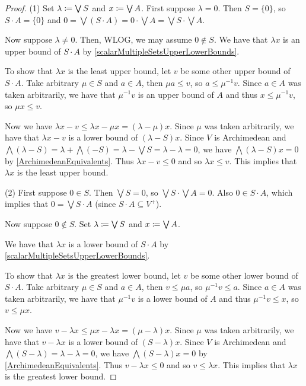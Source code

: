 \begin{proof}
(1) Set $\lambda \coloneqq \bigvee S$ and $x \coloneqq \bigvee A$. First suppose $\lambda = 0$. Then $S = \{0\}$, so $S\cdot A = \{0\}$ and $0 = \bigvee(S\cdot A) = 0\cdot \bigvee A = \bigvee S \cdot \bigvee A$.

Now suppose $\lambda \neq 0$. Then, WLOG, we may assume $0\notin S$. We have that $\lambda x$ is an upper bound of $S\cdot A$ by \ref{scalarMultipleSetsUpperLowerBounds}.

To show that $\lambda x$ is the least upper bound, let $v$ be some other upper bound of $S\cdot A$. Take arbitrary $\mu\in S$ and $a\in A$, then $\mu a \leq v$, so $a \leq \mu^{-1}v$. Since $a\in A$ was taken arbitrarily, we have that $\mu^{-1}v$ is an upper bound of $A$ and thus $x \leq \mu^{-1}v$, so $\mu x\leq v$.

Now we have $\lambda x - v \leq \lambda x - \mu x = (\lambda - \mu) x$. Since $\mu$ was taken arbitrarily, we have that $\lambda x - v$ is a lower bound of $(\lambda - S)x$. Since $V$ is Archimedean and $\bigwedge (\lambda - S) = \lambda + \bigwedge (-S) = \lambda - \bigvee S = \lambda - \lambda = 0$, we have $\bigwedge (\lambda - S)x = 0$ by \ref{ArchimedeanEquivalents}. Thus $\lambda x - v \leq 0$ and so $\lambda x \leq v$. This implies that $\lambda x$ is the least upper bound.

(2) First suppose $0\in S$. Then $\bigvee S = 0$, so $\bigvee S \cdot \bigvee A = 0$. Also $0\in S\cdot A$, which implies that $0 = \bigvee S\cdot A$ (since $S\cdot A \subseteq V^+$).

Now suppose $0\notin S$. Set $\lambda \coloneqq \bigvee S$ and $x\coloneqq \bigvee A$.

We have that $\lambda x$ is a lower bound of $S\cdot A$ by \ref{scalarMultipleSetsUpperLowerBounds}.

To show that $\lambda x$ is the greatest lower bound, let $v$ be some other lower bound of $S\cdot A$. Take arbitrary $\mu\in S$ and $a\in A$, then $v \leq \mu a$, so $\mu^{-1}v \leq a$. Since $a\in A$ was taken arbitrarily, we have that $\mu^{-1}v$ is a lower bound of $A$ and thus $\mu^{-1}v \leq x$, so $v \leq \mu x$.

Now we have $v - \lambda x \leq \mu x - \lambda x = (\mu - \lambda) x$. Since $\mu$ was taken arbitrarily, we have that $v - \lambda x$ is a lower bound of $(S - \lambda)x$. Since $V$ is Archimedean and $\bigwedge (S - \lambda) = \lambda - \lambda = 0$, we have $\bigwedge (S - \lambda)x = 0$ by \ref{ArchimedeanEquivalents}. Thus $v - \lambda x \leq 0$ and so $v \leq \lambda x$. This implies that $\lambda x$ is the greatest lower bound.
\end{proof}




